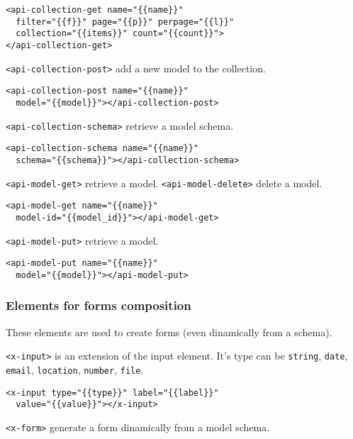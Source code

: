 \begin{lstlisting}[language=HTML5]
<api-collection-get name="{{name}}" 
  filter="{{f}}" page="{{p}}" perpage="{{l}}"  
  collection="{{items}}" count="{{count}}">
</api-collection-get>
\end{lstlisting}

\texttt{<api-collection-post>} add a new model to the collection. 

\begin{lstlisting}[language=HTML5]
<api-collection-post name="{{name}}" 
  model="{{model}}"></api-collection-post>
\end{lstlisting}

\texttt{<api-collection-schema>} retrieve a model schema.

\begin{lstlisting}[language=HTML5]
<api-collection-schema name="{{name}}" 
  schema="{{schema}}"></api-collection-schema>
\end{lstlisting}

\texttt{<api-model-get>} retrieve a model. 
\texttt{<api-model-delete>} delete a model. 

\begin{lstlisting}[language=HTML5]
<api-model-get name="{{name}}" 
  model-id="{{model_id}}"></api-model-get>
\end{lstlisting}

\texttt{<api-model-put>} retrieve a model. 

\begin{lstlisting}[language=HTML5]
<api-model-put name="{{name}}" 
  model="{{model}}"></api-model-put>
\end{lstlisting}


\subsubsection{Elements for forms composition}
These elements are used to create forms (even dinamically from a schema). 

\texttt{<x-input>} is an extension of the input element. 
It's type can be \texttt{string}, \texttt{date}, \texttt{email}, \texttt{location},
\texttt{number}, \texttt{file}.

\begin{lstlisting}[language=HTML5]
<x-input type="{{type}}" label="{{label}}"
  value="{{value}}"></x-input>
\end{lstlisting}

\texttt{<x-form>} generate a form dinamically from a model schema.

